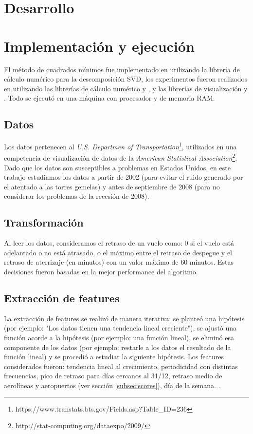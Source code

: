 \section{Desarrollo}\label{sec:desarrollo}

\section{Implementaci\'on y ejecuci\'on}\label{sec:ejecucion}
El m\'etodo de cuadrados m\'inimos fue implementado en  utilizando
la librer\'ia de c\'alculo num\'erico  para la descomposici\'on SVD,
los experimentos fueron realizados en  utilizando las librer\'ias
de c\'alculo num\'erico  y , y
las librer\'ias de visualizaci\'on  y .
Todo se ejecut\'o en una m\'aquina con procesador 
y  de memoria RAM.

\subsection{Datos}\label{subsec:datos}
Los datos pertenecen al \textit{U.S. Departmen of
Transportation}\footnote{https://www.transtats.bts.gov/Fields.asp?Table\_ID=236},
utilizados en una competencia de visualizaci\'on
de datos de la \textit{American Statistical Association}\footnote{
http://stat-computing.org/dataexpo/2009/}.
Dado que los datos son susceptibles a problemas en Estados Unidos, en este trabajo
estudiamos los datos a partir de 2002 (para evitar el ruido generado por el atentado a las torres
gemelas) y antes de septiembre de 2008 (para no considerar los problemas de la recesi\'on de 2008).

\subsection{Transformaci\'on}\label{subsec:transformacion}
Al leer los datos, consideramos el retraso de un vuelo como: 0 si el vuelo est\'a adelantado o no est\'a
atrasado, o el m\'aximo entre el retraso de despegue y el retraso de aterrizaje (en minutos) con un
valor m\'aximo de 60 minutos. Estas decisiones fueron basadas en la mejor performance del algoritmo.

\subsection{Extracci\'on de features}\label{subsec:extraccion}
La extracci\'on de features se realiz\'o de manera iterativa: se plante\'o una hip\'otesis (por ejemplo:
"Los datos tienen una tendencia lineal creciente"), se ajust\'o una funci\'on acorde a la hip\'otesis
(por ejemplo: una funci\'on lineal), se elimin\'o esa componente de los datos (por ejemplo: restarle a los datos
el resultado de la funci\'on lineal) y se procedi\'o a estudiar la siguiente hip\'otesis.
Los features considerados fueron: tendencia lineal al crecimiento, periodicidad con distintas frecuencias,
pico de retraso para d\'ias cercanos al 31/12, retraso medio de aerol\'ineas y aeropuertos
(ver secci\'on \ref{subsec:scores}), d\'ia de la semana.
.

